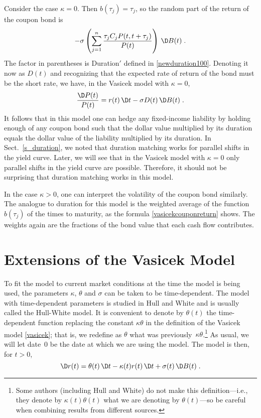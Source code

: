 Consider the case $\kappa=0$.  Then $b(\tau_j)=\tau_j$, so the random part of the return of the coupon bond  is
$$-\sigma\left(\sum_{j=1}^n \frac{\tau_jC_jP(t,t+\tau_j)}{P(t)}\right)\,\D B(t)\; .$$
The factor in parentheses is Duration$'$ defined in \eqref{newduration100}.  Denoting it now as $D(t)$ and recognizing that the expected rate of return of the bond must be the short rate, we have, in the Vasicek model with $\kappa=0$,
$$\frac{\D P(t)}{P(t)} = r(t)\,\D t - \sigma D(t)\,\D B(t)\; .$$
It follows that in this model one can hedge any fixed-income liability by holding enough of any coupon bond such that the dollar value multiplied by its  duration equals  the dollar value of the liability multiplied by its  duration.  In Sect.~\ref{s_duration}, we noted that duration matching works for parallel shifts in the yield curve.  Later, we will see that in the Vasicek model with $\kappa=0$ only parallel shifts in the yield curve are possible.  Therefore, it should not be surprising that duration matching works in this model.

In the case $\kappa>0$, one can interpret the volatility of the coupon bond similarly.  The analogue to duration for this model is the weighted average of the function $b(\tau_j)$ of the times to maturity, as the formula \eqref{vasicekcouponreturn} shows.  The weights again are the fractions of the bond value that each cash flow contributes.



\section{Extensions of the Vasicek Model}

To fit the model to current market conditions at the time the model is being used, the parameters $\kappa$, $\theta$ and $\sigma$ can be taken to be time-dependent.  The model with time-dependent parameters is studied in Hull and White \cite{HW} and is usually called the Hull-White model.  It is convenient to denote by $\theta(t)$ the time-dependent function replacing the constant $\kappa\theta$ in the definition of the Vasicek model \eqref{vasicek}; that is, we redefine as $\theta$ what was previously~$\kappa\theta$.\footnote{Some authors (including Hull and White) do not make this definition---i.e., they denote by $\kappa(t)\theta(t)$ what we are denoting by $\theta(t)$---so be careful when combining results from different sources.}   As usual, we will let date~0 be the date at which we are using the model.  The model is then, for $t>0$, 
\begin{equation}\label{hw500}
\D r(t) = \theta(t)\,\D t - \kappa(t)r(t)\,\D t + \sigma(t)\,\D B(t)\;.
\end{equation}

